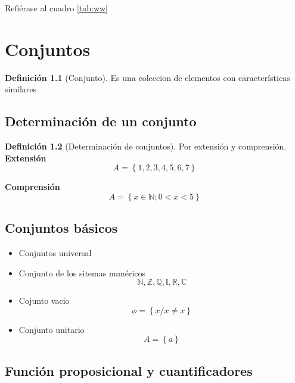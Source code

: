 \documentclass[
  16pt,
]{krantz}
\theoremstyle{definition}
\newtheorem{definition}{Definición}[chapter]
\theoremstyle{definition}
\theoremstyle{definition}
\theoremstyle{definition}
\theoremstyle{remark}
\begin{document}
Refiérase al cuadro \ref{tab:ww}

\hypertarget{conjuntos}{%
\chapter{Conjuntos}\label{conjuntos}}

\begin{definition}[Conjunto]
\protect\hypertarget{def:conjunto}{}\label{def:conjunto}Es una coleccion de elementos con características similares
\end{definition}

\hypertarget{determinaciuxf3n-de-un-conjunto}{%
\section{Determinación de un conjunto}\label{determinaciuxf3n-de-un-conjunto}}

\begin{definition}[Determinación de conjuntos]
\protect\hypertarget{def:conjunto2}{}\label{def:conjunto2}Por extensión y comprensión.
\textbf{Extensión}
\[A=\left\{ 1,2,3,4,5,6,7 \right\} \]

\textbf{Comprensión}
\[A=\left\{ x \in \mathbb{N};0<x<5 \right\}  \]
\end{definition}

\hypertarget{conjuntos-buxe1sicos}{%
\section{Conjuntos básicos}\label{conjuntos-buxe1sicos}}

\begin{itemize}
\item
  Conjuntos universal
\item
  Conjunto de los sitemas numéricos
  \[
  \mathbb{N}, \mathbb{Z}, \mathbb{Q}, \mathbb{I}, \mathbb{R}, \mathbb{C}
  \]
\item
  Cojunto vacio
  \[
  \phi=\left\{x/x\neq x\right\}
  \]
\item
  Conjunto unitario
  \[
  A=\left\{a\right\}
  \]
\end{itemize}

\hypertarget{funciuxf3n-proposicional-y-cuantificadores}{%
\section{Función proposicional y cuantificadores}\label{funciuxf3n-proposicional-y-cuantificadores}}
\end{document}
